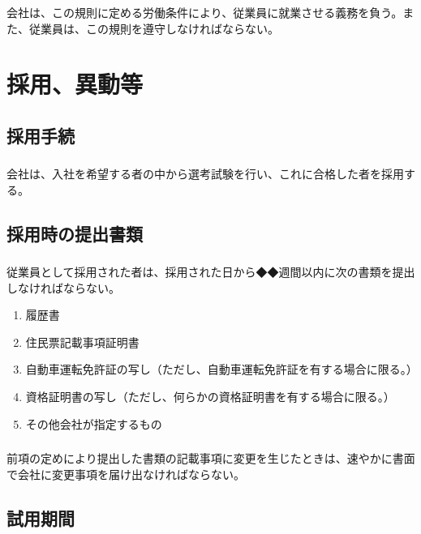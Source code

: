 \documentclass{jsarticle}
\begin{document}
\subsubsection{}
\label{就規_項_規則の遵守}
会社は、この規則に定める労働条件により、従業員に就業させる義務を負う。また、従業員は、この規則を遵守しなければならない。

\section{採用、異動等}
\label{就規_章_採用、異動等}

\subsection{採用手続}
\label{就規_条_採用手続}
\subsubsection{}
\label{就規_項_採用手続}
会社は、入社を希望する者の中から選考試験を行い、これに合格した者を採用する。

\subsection{採用時の提出書類}
\label{就規_条_採用時の提出書類}
\subsubsection{}
\label{就規_項_採用時の提出書類}
従業員として採用された者は、採用された日から◆◆週間以内に次の書類を提出しなければならない。
\begin{enumerate}
  \item 履歴書
  \item 住民票記載事項証明書
  \item 自動車運転免許証の写し（ただし、自動車運転免許証を有する場合に限る。）
  \item 資格証明書の写し（ただし、何らかの資格証明書を有する場合に限る。）
  \item その他会社が指定するもの
\end{enumerate}
\subsubsection{}
\label{就規_項_変更事項の届出}
前項の定めにより提出した書類の記載事項に変更を生じたときは、速やかに書面で会社に変更事項を届け出なければならない。

\subsection{試用期間}
\label{就規_条_試用期間}
\end{document}
